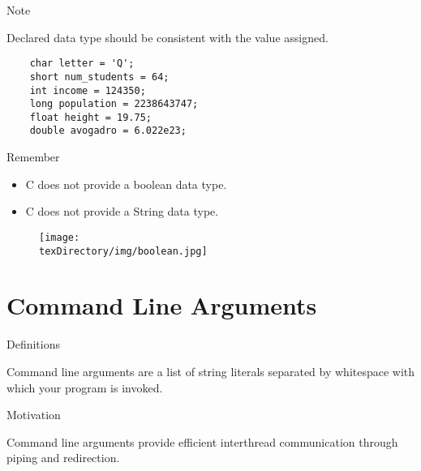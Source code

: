 \documentclass[compress]{beamer}
\begin{document}
\begin{slide}
	\begin{block}{Note}

	Declared data type should be consistent with the value assigned.

	\begin{verbatim}
	char letter = 'Q';
	short num_students = 64;
	int income = 124350;
	long population = 2238643747;
	float height = 19.75;
	double avogadro = 6.022e23;
	\end{verbatim}

	\end{block}
\end{slide}

\begin{slide}
	\begin{block}{Remember}

	\begin{itemize}
	\item[] C does not provide a boolean data type.
	\item[] C does not provide a String data type.
	\end{itemize}

	\end{block}
\end{slide}

\begin{slide}
	\begin{figure}
	\texttt{[image: \\texDirectory/img/boolean.jpg]}
	\end{figure}
\end{slide}

\section{Command Line Arguments}

\begin{slide}
	\begin{block}{Definitions}

	Command line arguments are a list of string literals separated by whitespace with which your program is invoked.

	\end{block}
\end{slide}

\begin{slide}
	\begin{block}{Motivation}

	Command line arguments provide efficient interthread communication through piping and redirection.

	\end{block}
\end{slide}
\end{document}
